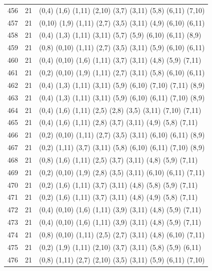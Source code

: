 \begin{appendix}
{\begin{longtable}{lll}
    456& 21 & (0,4)   (1,6)   (1,11)  (2,10)  (3,7)   (3,11)  (5,8)   (6,11)  (7,10)\\
    457& 21 & (0,10)  (1,9)   (1,11)  (2,7)   (3,5)   (3,11)  (4,9)   (6,10)  (6,11)\\
    458& 21 & (0,4)   (1,3)   (1,11)  (3,11)  (5,7)   (5,9)   (6,10)  (6,11)  (8,9)\\
    459& 21 & (0,8)   (0,10)  (1,11)  (2,7)   (3,5)   (3,11)  (5,9)   (6,10)  (6,11)\\
    460& 21 & (0,4)   (0,10)  (1,6)   (1,11)  (3,7)   (3,11)  (4,8)   (5,9)   (7,11)\\
    461& 21 & (0,2)   (0,10)  (1,9)   (1,11)  (2,7)   (3,11)  (5,8)   (6,10)  (6,11)\\
    462& 21 & (0,4)   (1,3)   (1,11)  (3,11)  (5,9)   (6,10)  (7,10)  (7,11)  (8,9)\\
    463& 21 & (0,4)   (1,3)   (1,11)  (3,11)  (5,9)   (6,10)  (6,11)  (7,10)  (8,9)\\
    464& 21 & (0,4)   (1,6)   (1,11)  (2,5)   (2,8)   (3,5)   (3,11)  (7,10)  (7,11)\\
    465& 21 & (0,4)   (1,6)   (1,11)  (2,8)   (3,7)   (3,11)  (4,9)   (5,8)   (7,11)\\
    466& 21 & (0,2)   (0,10)  (1,11)  (2,7)   (3,5)   (3,11)  (6,10)  (6,11)  (8,9)\\
    467& 21 & (0,2)   (1,11)  (3,7)   (3,11)  (5,8)   (6,10)  (6,11)  (7,10)  (8,9)\\
    468& 21 & (0,8)   (1,6)   (1,11)  (2,5)   (3,7)   (3,11)  (4,8)   (5,9)   (7,11)\\
    469& 21 & (0,2)   (0,10)  (1,9)   (2,8)   (3,5)   (3,11)  (6,10)  (6,11)  (7,11)\\
    470& 21 & (0,2)   (1,6)   (1,11)  (3,7)   (3,11)  (4,8)   (5,8)   (5,9)   (7,11)\\
    471& 21 & (0,2)   (1,6)   (1,11)  (3,7)   (3,11)  (4,8)   (4,9)   (5,8)   (7,11)\\
    472& 21 & (0,4)   (0,10)  (1,6)   (1,11)  (3,9)   (3,11)  (4,8)   (5,9)   (7,11)\\
    473& 21 & (0,4)   (0,10)  (1,6)   (1,11)  (3,9)   (3,11)  (4,8)   (5,9)   (7,11)\\
    474& 21 & (0,8)   (0,10)  (1,11)  (2,5)   (2,7)   (3,11)  (4,8)   (6,10)  (7,11)\\
    475& 21 & (0,2)   (1,9)   (1,11)  (2,10)  (3,7)   (3,11)  (5,8)   (5,9)   (6,11)\\
    476& 21 & (0,8)   (1,11)  (2,7)   (2,10)  (3,5)   (3,11)  (5,9)   (6,11)  (7,10)\\

\end{longtable}}
\end{appendix}
